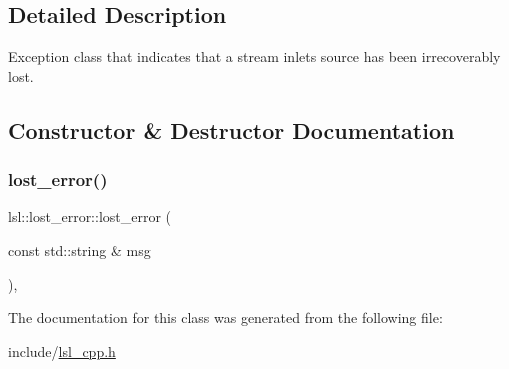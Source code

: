 \subsection{Detailed Description}
Exception class that indicates that a stream inlet\textquotesingle{}s source has been irrecoverably lost. 

\subsection{Constructor \& Destructor Documentation}
\mbox{\label{classlsl_1_1lost__error_a997ff6ff1ecd4fd33cda631b975d386e}} 
\subsubsection{\texorpdfstring{lost\+\_\+error()}{lost\_error()}}
{\footnotesize\ttfamily lsl\+::lost\+\_\+error\+::lost\+\_\+error (\begin{DoxyParamCaption}\item[{const std\+::string \&}]{msg }\end{DoxyParamCaption})\hspace{0.3cm}{\ttfamily [inline]}, {\ttfamily [explicit]}}



The documentation for this class was generated from the following file\+:\begin{DoxyCompactItemize}
\item 
include/\hyperlink{lsl__cpp_8h}{lsl\+\_\+cpp.\+h}\end{DoxyCompactItemize}
